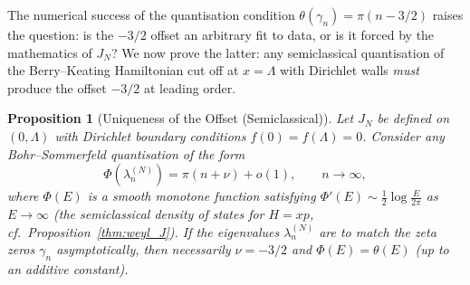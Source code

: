 \documentclass{pre-aomart}
\theoremstyle{plain}
\newtheorem{proposition}[theorem]{Proposition}
\theoremstyle{definition}
\theoremstyle{remark}
\begin{document}
The numerical success of the quantisation condition
$\theta(\gamma_n) = \pi(n - 3/2)$ raises the question: is the $-3/2$ offset
an arbitrary fit to data, or is it forced by the mathematics of $J_N$?
We now prove the latter: any semiclassical quantisation of the
Berry--Keating Hamiltonian cut off at $x = \Lambda$ with Dirichlet walls
\emph{must} produce the offset $-3/2$ at leading order.

\begin{proposition}[Uniqueness of the Offset (Semiclassical)]\label{thm:offset}
Let $J_N$ be defined on $(0,\Lambda)$ with Dirichlet boundary conditions
$f(0) = f(\Lambda) = 0$.  Consider any Bohr--Sommerfeld quantisation of the
form
\[
\Phi(\lambda_n^{(N)}) = \pi(n + \nu) + o(1), \qquad n \to \infty,
\]
where $\Phi(E)$ is a smooth monotone function satisfying
$\Phi'(E) \sim \frac{1}{2}\log\frac{E}{2\pi}$ as $E \to \infty$ (the
semiclassical density of states for $H = xp$, cf.\
Proposition~\ref{thm:weyl_J}).  If the eigenvalues $\lambda_n^{(N)}$
are to match the zeta zeros $\gamma_n$ asymptotically, then necessarily
$\nu = -3/2$ and $\Phi(E) = \theta(E)$ (up to an additive constant).
\end{proposition}
\end{document}
